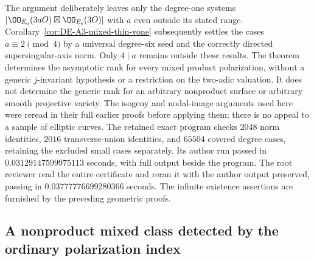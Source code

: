 \begin{remark}
\label{rem:DE-A3-mixed-product-scope}
The argument deliberately leaves only the degree-one systems
$|\OO_{E_{\rm o}}(3aO)\boxtimes\OO_{E_{\rm s}}(3O)|$ with
$a$ even outside its stated range.
Corollary~\ref{cor:DE-A3-mixed-thin-vone} subsequently settles
the cases $a\equiv2\pmod4$ by a universal degree-six seed and
the correctly directed supersingular-axis norm.
Only $4\mid a$ remains outside these results.
The theorem determines the asymptotic
rank for every mixed product polarization, without a generic
$j$-invariant hypothesis or a restriction on the two-adic valuation.
It does not determine the generic rank for an arbitrary
nonproduct surface or arbitrary smooth projective variety.
The isogeny and nodal-image arguments used here were reread in
their full earlier proofs before applying them; there is no
appeal to a sample of elliptic curves.
The retained exact program
checks $2048$ norm identities, $2016$ transverse-union identities,
and $65504$ covered degree cases, retaining the excluded small cases
separately.  Its author run passed in $0.03129147599975113$ seconds,
with full output beside the program.  The root reviewer read the entire
certificate and reran it with the author output preserved, passing in
$0.03777776699280366$ seconds.  The infinite existence assertions
are furnished by the preceding geometric proofs.
\end{remark}


\subsection{A nonproduct mixed class detected by the ordinary polarization index}
\label{sec:DE-A3-mixed-nonproduct}

